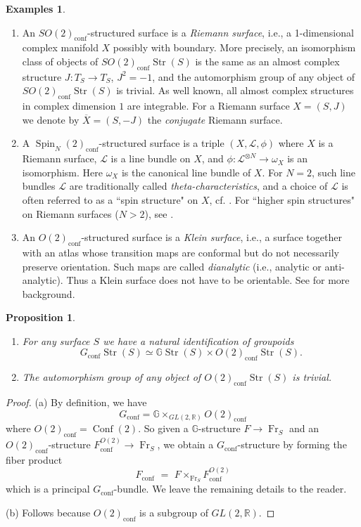 \documentclass[english,11pt,leqno]{article}
\def\GG{\mathbb{G}}
\def\RR{\mathbb{R}}
\def\Lc{\mathcal{L}}
\def\conf{{\on{conf}}}
\def\Conf{{\on{Conf}}}
\def\on{\operatorname}
\def\Fr{\on{Fr}}
\def\Gstr{\GG\on{Str}}
\def\Gcstr{G_\conf\on{Str}}
\newtheorem{prop}[thm]{Proposition}
\theoremstyle{definition}
\newtheorem{exas}[thm]{Examples}
\theoremstyle{remark}
\numberwithin{equation}{section}
\begin{document}
\begin{exas}
	\begin{enumerate}[label=(\alph{*})]
	\item An $SO(2)_\conf$-structured surface is a {\em Riemann surface}, i.e., a
		1-dimensional complex manifold $X$ possibly with boundary. More precisely, an
		isomorphism class of objects of $SO(2)_\conf \on{Str}(S)$ is the same as an almost
		complex structure $J: T_S\to T_S$, $J^2=-1$, and the automorphism group of any
		object of  $SO(2)_\conf \on{Str}(S)$ is trivial. As well known, all almost complex
		structures in complex dimension $1$ are integrable. For a Riemann surface $X=(S,J)$
		we denote by $\overline X = (S, -J)$ the {\em conjugate} Riemann surface.

	\item  A $\on{Spin}_N(2)_\conf$-structured surface is a triple $(X, \Lc, \phi)$
		where $X$ is a Riemann surface, $\Lc$ is a line bundle on $X$, and $\phi:
		\Lc^{\otimes N}\to\omega_X$ is an isomorphism. Here $\omega_X$ is the canonical line
		bundle of $X$.  For $N=2$, such line bundles $\Lc$ are traditionally called {\em
		theta-characteristics}, and a choice of $\Lc$ is often referred to as a ``spin
		structure" on $X$, cf.  \cite{atiyah}. For ``higher spin structures" on Riemann
		surfaces ($N>2$), see \cite{jarvis}. 
  
	\item An $O(2)_\conf$-structured surface is a {\em Klein surface}, i.e., a
		surface together with an atlas whose transition maps are conformal but do not
		necessarily preserve orientation.  Such maps are called {\em dianalytic} (i.e.,
		analytic or anti-analytic). Thus a Klein surface does not have to be orientable.
		See \cite{alling-greenleaf, braun} for more background. 
	\end{enumerate}
\end{exas}


\begin{prop}\label{prop:prod-of-grpds}
\begin{enumerate}
\item[(a)] For any surface $S$ we have a natural identification of groupoids
\[
\Gcstr(S) \simeq \Gstr(S)  \times  O(2)_\conf \on{Str}(S). 
\]
\item[(b)] The automorphism group of any object of $O(2)_\conf \on{Str}(S)$ is trivial.
\end{enumerate}
\end{prop}

\begin{proof} (a) By definition, we have
\[
G_\conf = \GG \times_{GL(2,\RR)} O(2)_{\conf}
\]
where $O(2)_{\conf}=\Conf(2)$. So given a $\GG$-structure $F\to \Fr_S$ and an $O(2)_\conf$-structure $F^{O(2)}_\conf \to\Fr_S$,
we obtain a $G_\conf$-structure by forming the fiber product
\[
F_\conf \,\,=\,\, F\times_{\Fr_S} F^{O(2)}_\conf
\]
which is a principal $G_\conf$-bundle. We leave the remaining details to the reader.

(b) Follows  because $O(2)_{\conf}$ is a subgroup of $GL(2,\RR)$. 
\end{proof}
\end{document}
